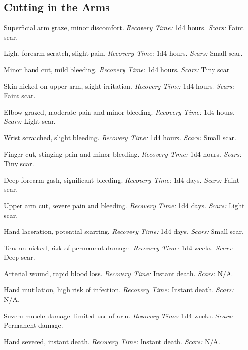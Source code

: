 \documentclass[12pt]{book}
\begin{document}
\subsection{Cutting in the Arms}

\begin{description}[labelwidth=1.5em, leftmargin=*, itemsep=0.4em]
    \item[01 -] Superficial arm graze, minor discomfort. \textit{Recovery Time:} 1d4 hours. \textit{Scars:} Faint scar.
    \item[02 -] Light forearm scratch, slight pain. \textit{Recovery Time:} 1d4 hours. \textit{Scars:} Small scar.
    \item[03 -] Minor hand cut, mild bleeding. \textit{Recovery Time:} 1d4 hours. \textit{Scars:} Tiny scar.
    \item[04 -] Skin nicked on upper arm, slight irritation. \textit{Recovery Time:} 1d4 hours. \textit{Scars:} Faint scar.
    \item[05 -] Elbow grazed, moderate pain and minor bleeding. \textit{Recovery Time:} 1d4 hours. \textit{Scars:} Light scar.
    \item[06 -] Wrist scratched, slight bleeding. \textit{Recovery Time:} 1d4 hours. \textit{Scars:} Small scar.
    \item[07 -] Finger cut, stinging pain and minor bleeding. \textit{Recovery Time:} 1d4 hours. \textit{Scars:} Tiny scar.
    \item[08 -] Deep forearm gash, significant bleeding. \textit{Recovery Time:} 1d4 days. \textit{Scars:} Faint scar.
    \item[09 -] Upper arm cut, severe pain and bleeding. \textit{Recovery Time:} 1d4 days. \textit{Scars:} Light scar.
    \item[10 -] Hand laceration, potential scarring. \textit{Recovery Time:} 1d4 days. \textit{Scars:} Small scar.
    \item[11 -] Tendon nicked, risk of permanent damage. \textit{Recovery Time:} 1d4 weeks. \textit{Scars:} Deep scar.
    \item[12 -] Arterial wound, rapid blood loss. \textit{Recovery Time:} Instant death. \textit{Scars:} N/A.
    \item[13 -] Hand mutilation, high risk of infection. \textit{Recovery Time:} Instant death. \textit{Scars:} N/A.
    \item[14 -] Severe muscle damage, limited use of arm. \textit{Recovery Time:} 1d4 weeks. \textit{Scars:} Permanent damage.
    \item[15 -] Hand severed, instant death. \textit{Recovery Time:} Instant death. \textit{Scars:} N/A.

\end{description}
\end{document}
